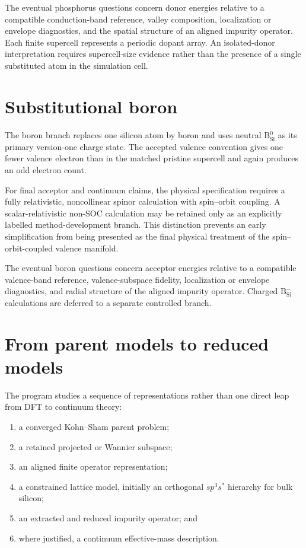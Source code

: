 The eventual phosphorus questions concern donor energies relative to a
compatible conduction-band reference, valley composition, localization or
envelope diagnostics, and the spatial structure of an aligned impurity
operator. Each finite supercell represents a periodic dopant array. An
isolated-donor interpretation requires supercell-size evidence rather than the
presence of a single substituted atom in the simulation cell.

\section{Substitutional boron}

The boron branch replaces one silicon atom by boron and uses neutral
B$_\mathrm{Si}^{0}$ as its primary version-one charge state. The accepted
valence convention gives one fewer valence electron than in the matched
pristine supercell and again produces an odd electron count.

For final acceptor and continuum claims, the physical specification requires a
fully relativistic, noncollinear spinor calculation with spin--orbit coupling.
A scalar-relativistic non-SOC calculation may be retained only as an explicitly
labelled method-development branch. This distinction prevents an early
simplification from being presented as the final physical treatment of the
spin--orbit-coupled valence manifold.

The eventual boron questions concern acceptor energies relative to a compatible
valence-band reference, valence-subspace fidelity, localization or envelope
diagnostics, and radial structure of the aligned impurity operator. Charged
B$_\mathrm{Si}^{-}$ calculations are deferred to a separate controlled branch.

\section{From parent models to reduced models}

The program studies a sequence of representations rather than one direct leap
from DFT to continuum theory:

\begin{enumerate}
  \item a converged Kohn--Sham parent problem;
  \item a retained projected or Wannier subspace;
  \item an aligned finite operator representation;
  \item a constrained lattice model, initially an orthogonal
    $sp^3s^{\ast}$ hierarchy for bulk silicon;
  \item an extracted and reduced impurity operator; and
  \item where justified, a continuum effective-mass description.
\end{enumerate}

